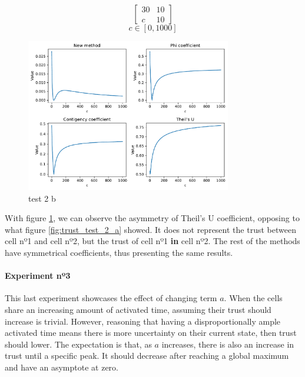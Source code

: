 $$
\begin{bmatrix}
    30 & 10 \\ c & 10
\end{bmatrix}
$$
$$
c \in [0, 1000]
$$
\begin{figure}[h!]
\centering
    \includegraphics[width=0.8\textwidth]{figures/chapter4/cell/trust_tests/2_b.pdf}
    \caption{test 2 b}
    \label{fig:trust_test_2_b}
\end{figure}
\FloatBarrier

With figure \ref{fig:trust_test_2_b}, we can observe the asymmetry of Theil's U coefficient, opposing to what figure \ref{fig:trust_test_2_a} showed. It does not represent the trust between cell nº1 and cell nº2, but the trust of cell nº1 \textbf{in} cell nº2. The rest of the methods have symmetrical coefficients, thus presenting the same results.

\paragraph{Experiment nº3} This last experiment showcases the effect of changing term $a$. When the cells share an increasing amount of activated time, assuming their trust should increase is trivial. However, reasoning that having a disproportionally ample activated time means there is more uncertainty on their current state, then trust should lower. The expectation is that, as $a$ increases, there is also an increase in trust until a specific peak. It should decrease after reaching a global maximum and have an asymptote at zero.

